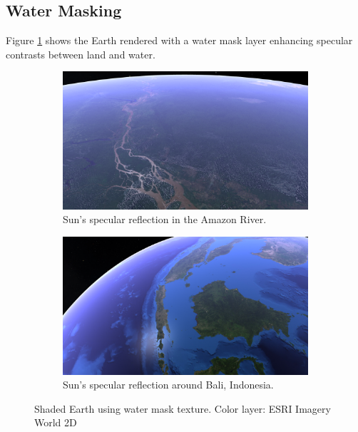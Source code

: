 \clearpage
\subsection{Water Masking}
\FloatBarrier
Figure \ref{fig:reswatermask} shows the Earth rendered with a water mask layer enhancing specular contrasts between land and water.
\begin{figure}[h]
    \centering
    \begin{subfigure}[bt]{0.8\textwidth}
        \includegraphics[width=\textwidth]{figures/results/screenshots/specular_brazil.png}
        \caption{Sun's specular reflection in the Amazon River.}
    \end{subfigure}
    \par\bigskip
    \begin{subfigure}[bt]{0.8\textwidth}
        \includegraphics[width=\textwidth]{figures/results/screenshots/specular_indonesia.png}
        \caption{Sun's specular reflection around Bali, Indonesia.}
    \end{subfigure}
    \caption{Shaded Earth using water mask texture. Color layer: ESRI Imagery World 2D \cite{imageryworld2d}}
    \label{fig:reswatermask}
\end{figure}


